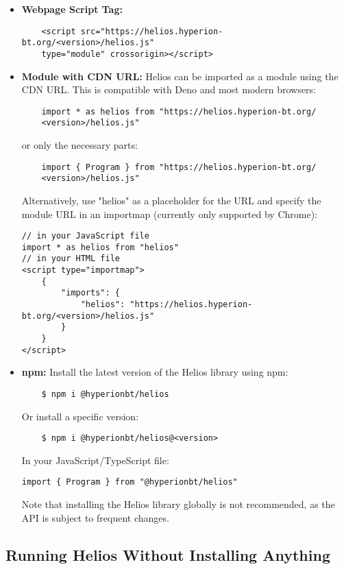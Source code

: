 \begin{itemize}
    \item \textbf{Webpage Script Tag:}
    \begin{verbatim}
    <script src="https://helios.hyperion-bt.org/<version>/helios.js" 
    type="module" crossorigin></script>
    \end{verbatim}
    
    \item \textbf{Module with CDN URL:} Helios can be imported as a module using the CDN URL. This is compatible with Deno and most modern browsers:
    \begin{verbatim}
    import * as helios from "https://helios.hyperion-bt.org/
    <version>/helios.js"
    \end{verbatim}
    or only the necessary parts:
    \begin{verbatim}
    import { Program } from "https://helios.hyperion-bt.org/
    <version>/helios.js"
    \end{verbatim}
    
    Alternatively, use "helios" as a placeholder for the URL and specify the module URL in an importmap (currently only supported by Chrome):
    \begin{verbatim}
// in your JavaScript file
import * as helios from "helios"
// in your HTML file
<script type="importmap">
    {
        "imports": {
            "helios": "https://helios.hyperion-bt.org/<version>/helios.js"
        }
    }
</script>
    \end{verbatim}
    
    \item \textbf{npm:} Install the latest version of the Helios library using npm:
    \begin{verbatim}
    $ npm i @hyperionbt/helios
    \end{verbatim}
    Or install a specific version:
    \begin{verbatim}
    $ npm i @hyperionbt/helios@<version>
    \end{verbatim}
    In your JavaScript/TypeScript file:
    \begin{verbatim}
import { Program } from "@hyperionbt/helios"
    \end{verbatim}
    Note that installing the Helios library globally is not recommended, as the API is subject to frequent changes.
\end{itemize}

\subsection{Running Helios Without Installing Anything}




